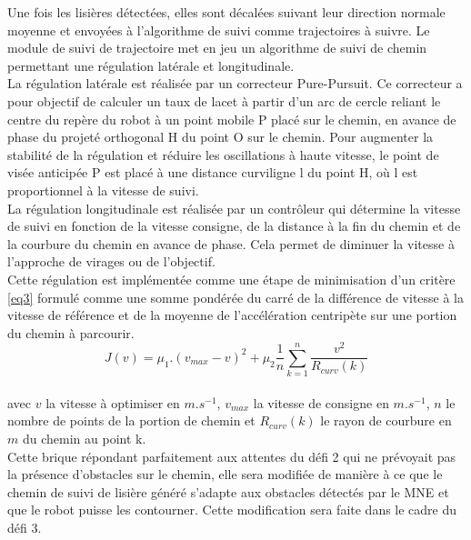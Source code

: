 \indent Une fois les lisières détectées, elles sont décalées suivant leur direction normale moyenne et envoyées à l'algorithme de suivi comme trajectoires à suivre. Le module de suivi de trajectoire met en jeu un algorithme de suivi de chemin permettant une régulation latérale et longitudinale.\\

\indent La régulation latérale est réalisée par un correcteur Pure-Pursuit. Ce correcteur a pour objectif de calculer un taux de lacet à partir d'un arc de cercle reliant le centre du repère du robot à un point mobile P placé sur le chemin, en avance de phase du projeté orthogonal H du point O sur le chemin. Pour augmenter la stabilité de la régulation et réduire les oscillations à haute vitesse, le point de visée anticipée P est placé à une distance curviligne l du point H, où l est proportionnel à la vitesse de suivi.\\

\indent La régulation longitudinale est réalisée par un contrôleur qui détermine la vitesse de suivi en fonction de la vitesse consigne, de la distance à la fin du chemin et de la courbure du chemin en avance de phase. Cela permet de diminuer la vitesse à l'approche de virages ou de l'objectif.\\

\indent Cette régulation est implémentée comme une étape de minimisation d'un critère \eqref{eq3} formulé comme une somme pondérée du carré de la différence de vitesse à la vitesse de référence et de la moyenne de l'accélération centripète sur une portion du chemin à parcourir.\\
\begin{equation} \label{eq3}
    J(v)=\mu_1.(v_{max}-v)^2+\mu_2\frac{1}{n}\sum_{k=1}^n\frac{v^2}{R_{curv}(k)}
\end{equation}
$\ $\\
avec $v$ la vitesse à optimiser en $m.s^{-1}$, $v_{max}$ la vitesse de consigne en $m.s^{-1}$, $n$ le nombre de points de la portion de chemin et $R_{curv}(k)$ le rayon de courbure en $m$ du chemin au point k.\\

\indent Cette brique répondant parfaitement aux attentes du défi 2 qui ne prévoyait pas la présence d'obstacles sur le chemin, elle sera modifiée de manière à ce que le chemin de suivi de lisière généré s'adapte aux obstacles détectés par le MNE et que le robot puisse les contourner. Cette modification sera faite dans le cadre du défi 3.


